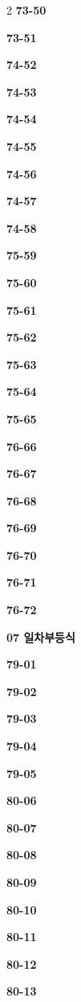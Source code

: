 \documentclass[10pt,a4paper]{article}
\begin{document}
\begin{multicols}{2}
\noindent\textbf{73-50}\ \par
\noindent\textbf{73-51}\ \par
\noindent\textbf{74-52}\ \par
\noindent\textbf{74-53}\ \par
\noindent\textbf{74-54}\ \par
\noindent\textbf{74-55}\ \par
\noindent\textbf{74-56}\ \par
\noindent\textbf{74-57}\ \par
\noindent\textbf{74-58}\ \par
\noindent\textbf{75-59}\ \par
\noindent\textbf{75-60}\ \par
\noindent\textbf{75-61}\ \par
\noindent\textbf{75-62}\ \par
\noindent\textbf{75-63}\ \par
\noindent\textbf{75-64}\ \par
\noindent\textbf{75-65}\ \par
\noindent\textbf{76-66}\ \par
\noindent\textbf{76-67}\ \par
\noindent\textbf{76-68}\ \par
\noindent\textbf{76-69}\ \par
\noindent\textbf{76-70}\ \par
\noindent\textbf{76-71}\ \par
\noindent\textbf{76-72}\ \par
\noindent\textbf{07 일차부등식}\par\smallskip
\noindent\textbf{79-01}\ \par
\noindent\textbf{79-02}\ \par
\noindent\textbf{79-03}\ \par
\noindent\textbf{79-04}\ \par
\noindent\textbf{79-05}\ \par
\noindent\textbf{80-06}\ \par
\noindent\textbf{80-07}\ \par
\noindent\textbf{80-08}\ \par
\noindent\textbf{80-09}\ \par
\noindent\textbf{80-10}\ \par
\noindent\textbf{80-11}\ \par
\noindent\textbf{80-12}\ \par
\noindent\textbf{80-13}\ \par

\end{multicols}
\end{document}
